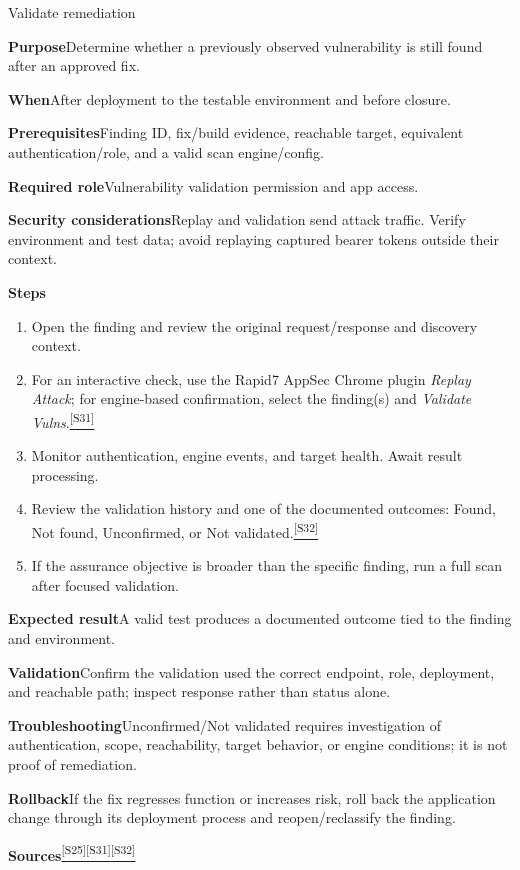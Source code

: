 \documentclass[11pt,letterpaper,oneside]{scrreprt}
\newcommand{\src}[1]{\hyperref[src:#1]{\textsuperscript{\color{R7Orange}[#1]}}}
\newcommand{\field}[1]{\par\smallskip\noindent\textbf{#1}\quad}
\begin{document}
\begin{procedure}{Validate remediation}
\field{Purpose}Determine whether a previously observed vulnerability is still found after an approved fix.
\field{When}After deployment to the testable environment and before closure.
\field{Prerequisites}Finding ID, fix/build evidence, reachable target, equivalent authentication/role, and a valid scan engine/config.
\field{Required role}Vulnerability validation permission and app access.
\field{Security considerations}Replay and validation send attack traffic. Verify environment and test data; avoid replaying captured bearer tokens outside their context.
\field{Steps}
\begin{enumerate}
  \item Open the finding and review the original request/response and discovery context.
  \item For an interactive check, use the Rapid7 AppSec Chrome plugin \emph{Replay Attack}; for engine-based confirmation, select the finding(s) and \emph{Validate Vulns}.\src{S31}
  \item Monitor authentication, engine events, and target health. Await result processing.
  \item Review the validation history and one of the documented outcomes: Found, Not found, Unconfirmed, or Not validated.\src{S32}
  \item If the assurance objective is broader than the specific finding, run a full scan after focused validation.
\end{enumerate}
\field{Expected result}A valid test produces a documented outcome tied to the finding and environment.
\field{Validation}Confirm the validation used the correct endpoint, role, deployment, and reachable path; inspect response rather than status alone.
\field{Troubleshooting}Unconfirmed/Not validated requires investigation of authentication, scope, reachability, target behavior, or engine conditions; it is not proof of remediation.
\field{Rollback}If the fix regresses function or increases risk, roll back the application change through its deployment process and reopen/reclassify the finding.
\field{Sources}\src{S25}\src{S31}\src{S32}
\end{procedure}
\end{document}

